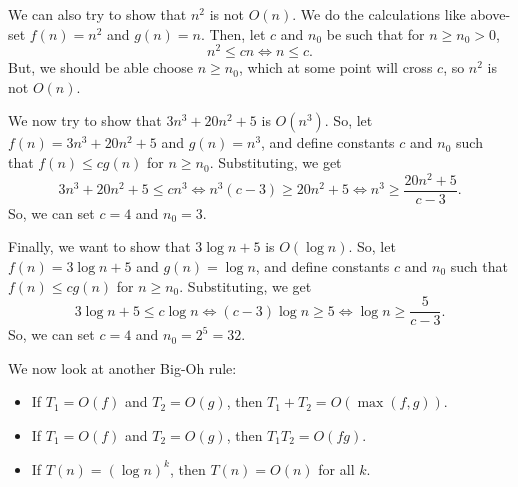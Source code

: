 \documentclass[a4paper, openany]{memoir}
\begin{document}
\noindent We can also try to show that $n^2$ is not $O(n)$. We do the calculations like above- set $f(n) = n^2$ and $g(n) = n$. Then, let $c$ and $n_0$ be such that for $n \geq n_0 > 0$,
\[n^2 \leq cn \iff n \leq c.\]
But, we should be able choose $n \geq n_0$, which at some point will cross $c$, so $n^2$ is not $O(n)$.

\noindent We now try to show that $3n^3 + 20n^2 + 5$ is $O(n^3)$. So, let $f(n) = 3n^3 + 20n^2 + 5$ and $g(n) = n^3$, and define constants $c$ and $n_0$ such that $f(n) \leq cg(n)$ for $n \geq n_0$. Substituting, we get
\[3n^3 + 20n^2 + 5 \leq cn^3 \iff n^3(c - 3) \geq 20n^2 + 5 \iff n^3 \geq \frac{20n^2 + 5}{c - 3}.\]
So, we can set $c = 4$ and $n_0 = 3$.

\noindent Finally, we want to show that $3 \log n + 5$ is $O(\log n)$. So, let $f(n) = 3 \log n + 5$ and $g(n) = \log n$, and define constants $c$ and $n_0$ such that $f(n) \leq cg(n)$ for $n \geq n_0$. Substituting, we get
\[3\log n + 5 \leq c\log n \iff (c - 3) \log n \geq 5 \iff \log n \geq \frac{5}{c - 3}.\]
So, we can set $c = 4$ and $n_0 = 2^5 = 32$.

\noindent We now look at another Big-Oh rule: 
\begin{itemize}
    \item If $T_1 = O(f)$ and $T_2 = O(g)$, then $T_1 + T_2 = O(\max(f, g))$.
    \item If $T_1 = O(f)$ and $T_2 = O(g)$, then $T_1 T_2 = O(fg)$.
    \item If $T(n) = (\log n)^k$, then $T(n) = O(n)$ for all $k$.
\end{itemize}
\end{document}
